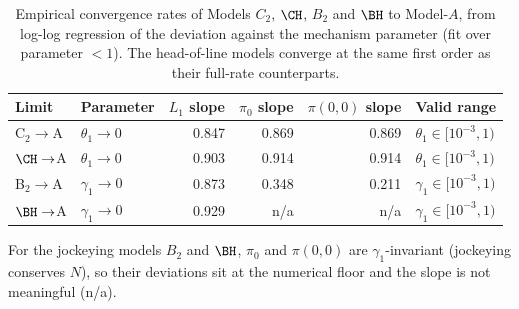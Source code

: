 \begin{table}[t]\centering
\caption{Empirical convergence rates of Models $C_2$, $\CH$, $B_2$ and $\BH$ to Model-$A$, from log-log regression of the deviation against the mechanism parameter (fit over parameter $<1$). The head-of-line models converge at the same first order as their full-rate counterparts.}
\label{tab:conv:rates}
\begin{tabular}{llrrrl}
\toprule
Limit & Parameter & $L_1$ slope & $\pi_0$ slope & $\pi(0,0)$ slope & Valid range \\
\midrule
C$_2\to$A & $\theta_1\to0$ & 0.847 & 0.869 & 0.869 & $\theta_1\in[10^{-3},1)$ \\
$\CH\to$A & $\theta_1\to0$ & 0.903 & 0.914 & 0.914 & $\theta_1\in[10^{-3},1)$ \\
\midrule
B$_2\to$A & $\gamma_1\to0$ & 0.873 & 0.348 & 0.211 & $\gamma_1\in[10^{-3},1)$ \\
$\BH\to$A & $\gamma_1\to0$ & 0.929 & n/a & n/a & $\gamma_1\in[10^{-3},1)$ \\
\bottomrule
\end{tabular}
\footnotesize\par\vspace{2pt}For the jockeying models $B_2$ and $\BH$, $\pi_0$ and $\pi(0,0)$ are $\gamma_1$-invariant (jockeying conserves $N$), so their deviations sit at the numerical floor and the slope is not meaningful (n/a).
\end{table}
